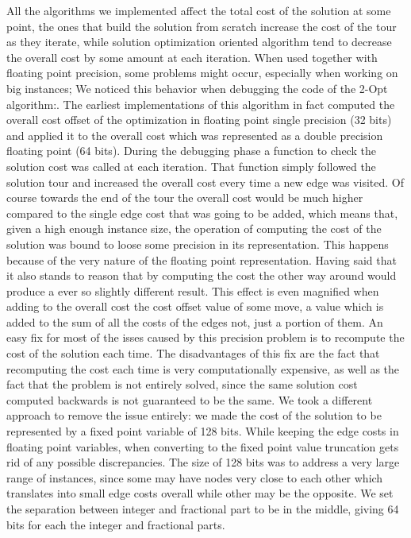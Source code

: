 All the algorithms we implemented affect the total cost of the solution at some point, the ones that build the solution from scratch increase the cost of the tour as they iterate, while solution optimization oriented algorithm tend to decrease the overall cost by some amount at each iteration.
When used together with floating point precision, some problems might occur, especially when working on big instances;
We noticed this behavior when debugging the code of the 2-Opt algorithm:.
The earliest implementations of this algorithm in fact computed the overall cost offset of the optimization in floating point single precision (32 bits) and applied it to the overall cost which was represented as a double precision floating point (64 bits).
During the debugging phase a function to check the solution cost was called at each iteration.
That function simply followed the solution tour and increased the overall cost every time a new edge was visited.
Of course towards the end of the tour the overall cost would be much higher compared to the single edge cost that was going to be added, which means that, given a high enough instance size, the operation of computing the cost of the solution was bound to loose some precision in its representation.
This happens because of the very nature of the floating point representation.
Having said that it also stands to reason that by computing the cost the other way around would produce a ever so slightly different result.
This effect is even magnified when adding to the overall cost the cost offset value of some move, a value which is added to the sum of all the costs of the edges not, just a portion of them.
An easy fix for most of the isses caused by this precision problem is to recompute the cost of the solution each time.
The disadvantages of this fix are the fact that recomputing the cost each time is very computationally expensive, as well as the fact that the problem is not entirely solved, since the same solution cost computed backwards is not guaranteed to be the same.
We took a different approach to remove the issue entirely: we made the cost of the solution to be represented by a fixed point variable of 128 bits.
While keeping the edge costs in floating point variables, when converting to the fixed point value truncation gets rid of any possible discrepancies.
The size of 128 bits was to address a very large range of instances, since some may have nodes very close to each other which translates into small edge costs overall while other may be the opposite.
We set the separation between integer and fractional part to be in the middle, giving 64 bits for each the integer and fractional parts.